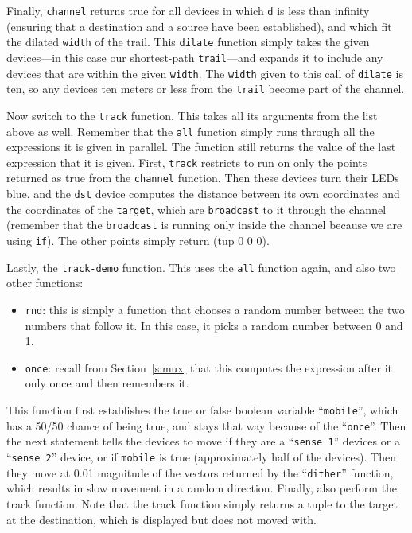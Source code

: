 \documentclass{article}
\newcommand\var[1]{{\tt #1}}
\newcommand\qvar[1]{``{\tt #1}''}
\begin{document}
Finally, \var{channel} returns true for all devices in which \var{d}
is less than infinity (ensuring that a destination and a source have
been established), and which fit the dilated \var{width} of the
trail. This \var{dilate} function simply takes the given devices---in
this case our shortest-path \var{trail}---and expands it to include
any devices that are within the given \var{width}. The \var{width}
given to this call of \var{dilate} is ten, so any devices ten meters
or less from the \var{trail} become part of the channel.

Now switch to the \var{track} function.  This takes all its arguments
from the list above as well.  Remember that the \var{all} function
simply runs through all the expressions it is given in parallel.  The
function still returns the value of the last expression that it is
given.  First, \var{track} restricts to run on only the points
returned as true from the \var{channel} function.  Then these devices
turn their LEDs blue, and the \var{dst} device computes the distance
between its own coordinates and the coordinates of the \var{target},
which are \var{broadcast} to it through the channel (remember that the
\var{broadcast} is running only inside the channel because we are
using \var{if}).  The other points simply return (tup 0 0 0).

Lastly, the \var{track-demo} function.  This uses the \var{all}
function again, and also two other functions:
\begin{itemize}
\item \var{rnd}: this is simply a function that chooses a random
  number between the two numbers that follow it.  In this case, it
  picks a random number between 0 and 1.
\item \var{once}: recall from Section~\ref{s:mux} that this computes
  the expression after it only once and then remembers it.
\end{itemize}

This function first establishes the true or false boolean variable
\qvar{mobile}, which has a 50/50 chance of being true, and stays that
way because of the \qvar{once}.  Then the next statement tells the
devices to move if they are a \qvar{sense 1} devices or a \qvar{sense
  2} device, or if \var{mobile} is true (approximately half of the
devices).  Then they move at 0.01 magnitude of the vectors returned by
the \qvar{dither} function, which results in slow movement in a random
direction.  Finally, also perform the track function.  Note that the
track function simply returns a tuple to the target at the
destination, which is displayed but does not moved with.
\end{document}

